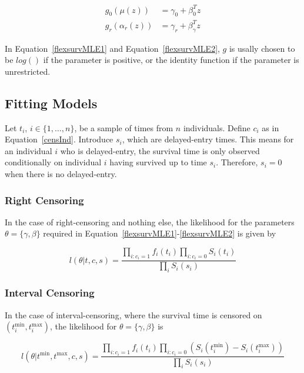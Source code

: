 \begin{align}
    g_0(\mu(z)) &= \gamma_0 + \beta_0^Tz \label{flexsurvMLE1}\\
    g_r(\alpha_r(z)) &= \gamma_r + \beta_{\gamma}^Tz \label{flexsurvMLE2}
\end{align}

In Equation~\ref{flexsurvMLE1} and Equation~\ref{flexsurvMLE2}, $g$ is usally chosen to be $log()$ if the parameter is positive, or the identity function if the parameter is unrestricted.

\subsection{Fitting Models}
Let $t_i$, $i \in \{1, \ldots, n\}$, be a sample of times from $n$ individuals. Define $c_i$ as in Equation~\ref{censInd}. Introduce $s_i$, which are delayed-entry times. This means for an individual $i$ who is delayed-entry, the survival time is only observed conditionally on individual $i$ having survived up to time $s_i$. Therefore, $s_i = 0$ when there is no delayed-entry. 

\subsubsection{Right Censoring}
In the case of right-censoring and nothing else, the likelihood for the parameters $\theta = \{\gamma, \beta\}$ required in Equation~\ref{flexsurvMLE1}-\ref{flexsurvMLE2} is given by 

\begin{equation}
    l(\theta|t,c,s) = \frac{\prod_{i:c_i=1} f_i(t_i) \prod_{i:c_i=0} S_i(t_i)}{\prod_{i} S_i(s_i)}
    \label{flexsurvRightCens}
\end{equation}

\subsubsection{Interval Censoring}
In the case of interval-censoring, where the survival time is censored on $(t_i^{\text{min}}, t_i^{\text{max}})$, the likelihood for $\theta = \{\gamma, \beta\}$ is 

\begin{equation}
    \label{flexSurvIntCens}
    l(\theta|t^\text{min}, t^\text{max}, c,s) = \frac{\prod_{i:c_i=1} f_i(t_i) \prod_{i:c_i=0} \left(S_i(t_i^{\text{min}}) - S_i(t_i^{\text{max}}) \right)}{\prod_{i} S_i(s_i)}
\end{equation}

